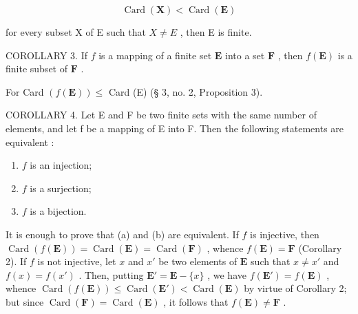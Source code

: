 \[
\operatorname{Card} (\mathbf {X}) <   \operatorname{Card} (\mathbf {E})
\]

for every subset X of E such that \(X \neq E\) , then E is finite.

COROLLARY 3. If \(f\) is a mapping of a finite set \(\mathbf{E}\) into a set \(\mathbf{F}\) , then \(f(\mathbf{E})\) is a finite subset of \(\mathbf{F}\) .

For Card \((f(\mathbf{E}))\leqslant\) Card (E) (§ 3, no. 2, Proposition 3).

COROLLARY 4. Let E and F be two finite sets with the same number of elements, and let f be a mapping of E into F. Then the following statements are equivalent :

\begin{enumerate}
\def\labelenumi{(\alph{enumi})}
\item
  \(f\) is an injection;
\item
  \(f\) is a surjection;
\item
  \(f\) is a bijection.
\end{enumerate}

It is enough to prove that (a) and (b) are equivalent. If \(f\) is injective, then \(\operatorname{Card}(f(\mathbf{E})) = \operatorname{Card}(\mathbf{E}) = \operatorname{Card}(\mathbf{F})\) , whence \(f(\mathbf{E}) = \mathbf{F}\) (Corollary 2). If \(f\) is not injective, let \(x\) and \(x'\) be two elements of \(\mathbf{E}\) such that \(x \neq x'\) and \(f(x) = f(x')\) . Then, putting \(\mathbf{E}' = \mathbf{E} - \{x\}\) , we have \(f(\mathbf{E}') = f(\mathbf{E})\) , whence \(\operatorname{Card}(f(\mathbf{E})) \leqslant \operatorname{Card}(\mathbf{E}') < \operatorname{Card}(\mathbf{E})\) by virtue of Corollary 2; but since \(\operatorname{Card}(\mathbf{F}) = \operatorname{Card}(\mathbf{E})\) , it follows that \(f(\mathbf{E}) \neq \mathbf{F}\) .

